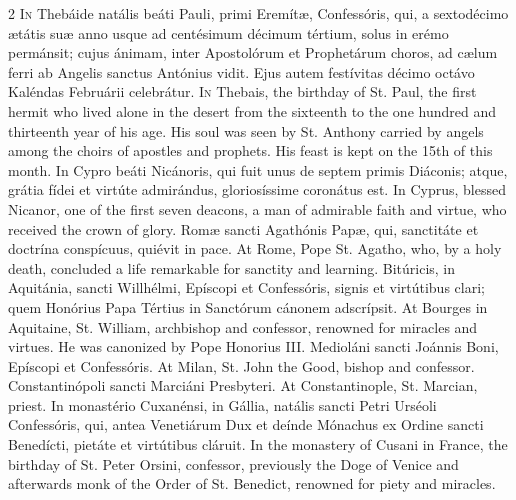 \begin{paracol}{2}
\lettrine[lines=2]{I}{n} Thebáide natális beáti Pauli, primi Eremítæ, 
 Confessóris, qui, a sextodécimo ætátis suæ anno usque ad centésimum décimum 
 tértium, solus in erémo permánsit; cujus ánimam, inter Apostolórum et 
 Prophetárum choros, ad cælum ferri ab Angelis sanctus Antónius vidit. 
 Ejus autem festívitas décimo octávo Kaléndas Februárii celebrátur.
\switchcolumn
{}
\lettrine[lines=2]{I}{n} Thebais, the birthday of St. Paul, the first hermit who lived alone in 
 the desert from the sixteenth to the one hundred and thirteenth year of his 
 age. His soul was seen by St. Anthony carried by angels among the 
 choirs of apostles and prophets. His feast is kept on the 15th of this 
 month.
\switchcolumn*
{}
In Cypro beáti Nicánoris, qui fuit unus de 
 septem primis Diáconis; atque, grátia fídei et virtúte admirándus, 
 gloriosíssime coronátus est.
\switchcolumn
{}
In Cyprus, blessed Nicanor, one of the first seven deacons, a man of 
 admirable faith and virtue, who received the crown of glory.
\switchcolumn*
{}
Romæ sancti Agathónis Papæ, qui, sanctitáte et 
 doctrína conspícuus, quiévit in pace.
\switchcolumn
{}
At Rome, Pope St. Agatho, who, by a holy death, concluded a life remarkable 
 for sanctity and learning.
\switchcolumn*
{}
Bitúricis, in Aquitánia, sancti Willhélmi, 
 Epíscopi et Confessóris, signis et virtútibus clari; quem Honórius Papa 
 Tértius in Sanctórum cánonem adscrípsit.
\switchcolumn
{}
At Bourges in Aquitaine, St. William, archbishop and confessor, renowned for 
 miracles and virtues. He was canonized by Pope Honorius III.
\switchcolumn*
{}
Medioláni sancti Joánnis Boni, Epíscopi et Confessóris.
\switchcolumn
{}
At Milan, St. John the Good, bishop and confessor.
\switchcolumn*
{}
Constantinópoli sancti Marciáni Presbyteri.
\switchcolumn
{}
At Constantinople, St. Marcian, priest.
\switchcolumn*
{}
In monastério Cuxanénsi, in Gállia, natális sancti Petri Urséoli 
 Confessóris, qui, antea Venetiárum Dux et deínde Mónachus ex Ordine sancti 
 Benedícti, pietáte et virtútibus cláruit.
\switchcolumn
{}
In the monastery of Cusani in France, the birthday of St. Peter Orsini, 
 confessor, previously the Doge of Venice and afterwards monk of the Order of 
 St. Benedict, renowned for piety and miracles.

\end{paracol}
